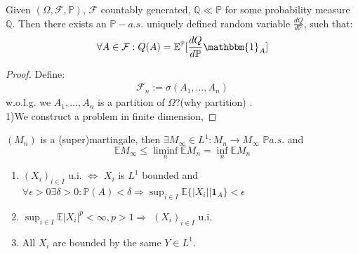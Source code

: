 \begin{theorem}
	Given $(\Omega, \mathcal{F}, \mathbb{P})$, $\mathcal{F}$ countably generated, $\mathbb{Q} \ll \mathbb{P}$ for some probability measure $\mathbb{Q}.$ Then there exists an $\mathbb{P}-a.s.$ uniquely defined random variable $\frac{dQ}{d\mathbb{P}}$, such that:
	\begin{align*}
		\forall A \in \mathcal{F}: Q(A) = \mathbb{E}^\mathbb{P}[\frac{dQ}{d\mathbb{P}} \mathbbm{1}_{A}]
	\end{align*}
\end{theorem}
\begin{proof}
	Define:
	\begin{align*}
		\mathcal{F}_n:= \sigma(A_1, \dots, A_n)
	\end{align*}
	w.o.l.g. we $A_1, \dots, A_n$ is a partition of $\Omega$?(why partition) \label{Q:partition}.\\
	1)We construct a problem in finite dimension, 
\end{proof}

\begin{corollary}
	
\end{corollary}











 
\begin{corollary}
 	$(M_n)$ is a (super)martingale, then $\exists M_\infty \in L^1: M_n \rightarrow M_\infty$ $\mathbb{P} a.s.$ and 
 	\begin{equation*}
 		\mathbb{E}M_\infty \leq \liminf_n \mathbb{E} M_n = \inf_n \mathbb{E} M_n
 	\end{equation*}
 \end{corollary}
 

 
 \begin{lemma} \quad
 	\begin{enumerate}
 		\item $(X_i)_{i \in I}$ u.i. $\Leftrightarrow$ $X_i$ is $L^1$ bounded and $\forall \epsilon > 0 \exists \delta > 0: \mathbb{P}(A) < \delta \Rightarrow \sup_{i \in I}\mathbb{E}\{|X_i|| \textbf{1}_A\} < \epsilon$
 		\item $\sup_{i \in I}\mathbb{E} |X_i|^p < \infty, p > 1 \Rightarrow$ $(X_i)_{i \in I}$ u.i.  
 		\item All $X_i$ are bounded by the same $Y \in L^1$.
 	\end{enumerate}
 \end{lemma}
 

